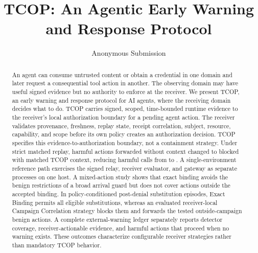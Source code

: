 \documentclass[letterpaper,twocolumn,10pt]{article}
\date{}
\title{\Large \bf TCOP: An Agentic Early Warning and Response Protocol}
\author{\TCOPPreprintAuthor}
\author{Anonymous Submission}
\begin{document}
\maketitle
\begin{abstract}
An agent can consume untrusted content or obtain a credential in one domain and later request a consequential tool action in another. The observing domain may have useful signed evidence but no authority to enforce at the receiver. We present TCOP, an early warning and response protocol for AI agents, where the receiving domain decides what to do. TCOP carries signed, scoped, time-bounded runtime evidence to the receiver's local authorization boundary for a pending agent action. The receiver validates provenance, freshness, replay state, receipt correlation, subject, resource, capability, and scope before its own policy creates an authorization decision. TCOP specifies this evidence-to-authorization boundary, not a containment strategy. Under strict matched replay, \DeterministicActionsPrevented{} harmful actions forwarded without context changed to blocked with matched TCOP context, reducing harmful calls from \DeterministicBaselineHarmfulCalls{} to \DeterministicTreatmentHarmfulCalls{}. A single-environment reference path exercises the signed relay, receiver evaluator, and gateway as separate processes on one host. A mixed-action study shows that exact binding avoids the benign restrictions of a broad arrival guard but does not cover actions outside the accepted binding. In \AdaptiveStrictEpisodes{} policy-conditioned post-denial substitution episodes, Exact Binding permits all \AdaptiveCTwoPostDenialCompleted{} eligible substitutions, whereas an evaluated receiver-local Campaign Correlation strategy blocks them and forwards the tested outside-campaign benign actions. A complete external-warning ledger separately reports detector coverage, receiver-actionable evidence, and harmful actions that proceed when no warning exists. These outcomes characterize configurable receiver strategies rather than mandatory TCOP behavior.
\end{abstract}












\appendix







\end{document}
